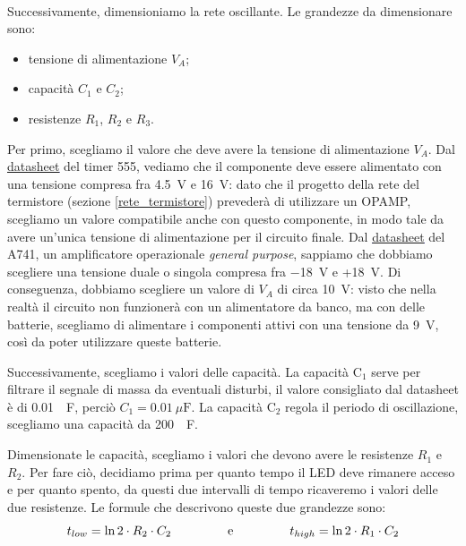 \documentclass{report}
\begin{document}
\\Successivamente, dimensioniamo la rete oscillante. Le grandezze da dimensionare sono:
\begin{itemize}
\item tensione di alimentazione $V_A$;
\item capacità $C_1$ e $C_2$;
\item resistenze $R_1$, $R_2$ e $R_3$.
\end{itemize}
Per primo, scegliamo il valore che deve avere la tensione di alimentazione $V_A$. Dal \textcolor{blue}{\underline{\href{https://www.ti.com/lit/ds/symlink/lm555.pdf?ts=1667144089940&ref_url=https\%253A\%252F\%252Fwww.ti.com\%252Fproduct\%252FLM555}{datasheet}}} del timer 555, vediamo che il componente deve essere alimentato con una tensione compresa fra \SI{4.5}{\volt} e \SI{16}{\volt}: dato che il progetto della rete del termistore (sezione \ref{rete_termistore}) prevederà di utilizzare un OPAMP, scegliamo un valore compatibile anche con questo componente, in modo tale da avere un'unica tensione di alimentazione per il circuito finale. Dal \textcolor{blue}{\underline{\href{https://www.ti.com/lit/ds/symlink/ua741.pdf?ts=1672216941275&ref_url=https\%253A\%252F\%252Fwww.ti.com\%252Fproduct\%252FUA741}{datasheet}}} del \textmu A741, un amplificatore operazionale \textit{general purpose}, sappiamo che dobbiamo scegliere una tensione duale o singola compresa fra \SI{-18}{\volt} e +\SI{18}{\volt}. Di conseguenza, dobbiamo scegliere un valore di  $V_A$ di circa \SI{10}{\volt}: visto che nella realtà il circuito non funzionerà con un alimentatore da banco, ma con delle batterie, scegliamo di alimentare i componenti attivi con una tensione da \SI{9}{\volt}, così da poter utilizzare queste batterie. \par
Successivamente, scegliamo i valori delle capacità. La capacità $\mathrm{C_1}$ serve per filtrare il segnale di massa da eventuali disturbi, il valore consigliato dal datasheet è di \SI{0.01}{\mu\farad}, perciò $\displaystyle{C_1=\SI{0.01}{\mu\farad}}$. La capacità $\mathrm{C_2}$ regola il periodo di oscillazione, scegliamo una capacità da \SI{200}{\mu\farad}. \par
Dimensionate le capacità, scegliamo i valori che devono avere le resistenze $R_1$ e $R_2$. Per fare ciò, decidiamo prima per quanto tempo il LED deve rimanere acceso e per quanto spento, da questi due intervalli di tempo ricaveremo i valori delle due resistenze. Le formule che descrivono queste due grandezze sono:
\\$$t_{low}=\ln2\cdot R_2\cdot C_2\indent\indent\indent \mathrm{e}\indent\indent\indent t_{high}=\ln2\cdot R_1\cdot C_2$$
\end{document}
